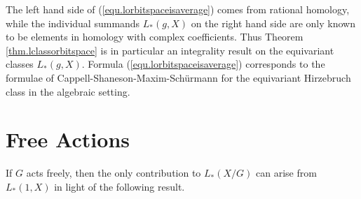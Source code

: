 \documentclass{amsart}
\theoremstyle{definition}
\theoremstyle{remark}
\begin{document}
The left hand side of (\ref{equ.lorbitspaceisaverage})
comes from rational homology, while
the individual summands $L_* (g,X)$ on the right hand side
are only known to be elements in homology with complex coefficients.
Thus Theorem \ref{thm.lclassorbitspace} is in particular an integrality result 
on the equivariant classes $L_* (g,X)$.
Formula (\ref{equ.lorbitspaceisaverage})
corresponds to the formulae of
Cappell-Shaneson-Maxim-Sch\"urmann \cite[p. 1726f, (1.11), (1.12)]{cmssequivcharcl}
for the equivariant Hirzebruch class in the algebraic setting.




\section{Free Actions}
\label{sec.freeactions}

If $G$ acts freely, then the only contribution to $L_* (X/G)$
can arise from $L_* (1,X)$ in light
of the following result.
\end{document}
